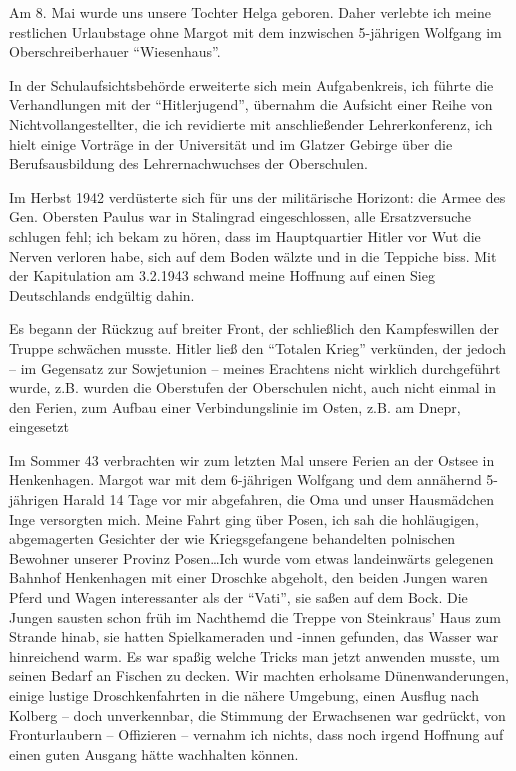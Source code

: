 \documentclass[a5paper,pagesize,10pt,twoside=true]{scrbook}
\renewcommand{\marginpar}[2][]{}
\begin{document}
Am 8. Mai wurde uns unsere Tochter Helga geboren. Daher verlebte ich meine restlichen Urlaubstage ohne Margot mit dem inzwischen 5-jährigen Wolfgang im Oberschreiberhauer \enquote{Wiesenhaus}.

In der Schulaufsichtsbehörde erweiterte sich mein Aufgabenkreis, ich führte die Verhandlungen mit der \enquote{Hitlerjugend}, übernahm die Aufsicht einer Reihe von Nichtvollangestellter, die ich revidierte mit anschließender Lehrerkonferenz, ich hielt einige Vorträge in der Universität und im Glatzer Gebirge über die Berufsausbildung des Lehrernachwuchses der Oberschulen.

Im Herbst 1942 verdüsterte sich für uns der militärische Horizont: die Armee des Gen. Obersten Paulus war in Stalingrad eingeschlossen, alle Ersatzversuche schlugen fehl; ich bekam zu hören, dass im Hauptquartier Hitler vor Wut die Nerven verloren habe, sich auf dem Boden wälzte und in die Teppiche biss. Mit der Kapitulation am 3.2.1943 schwand meine Hoffnung auf einen Sieg Deutschlands endgültig dahin.

\marginpar{34} Es begann der Rückzug auf breiter Front, der schließlich den Kampfeswillen der Truppe schwächen musste. Hitler ließ den \enquote{Totalen Krieg} verkünden, der jedoch -- im Gegensatz zur Sowjetunion -- meines Erachtens nicht wirklich durchgeführt wurde, z.B. wurden die Oberstufen der Oberschulen nicht, auch nicht einmal in den Ferien, zum Aufbau einer Verbindungslinie im Osten, z.B. am Dnepr, eingesetzt

\marginpar{35} Im Sommer 43 verbrachten wir zum letzten Mal unsere Ferien an der Ostsee in Henkenhagen. Margot war mit dem 6-jährigen Wolfgang und dem annähernd 5-jährigen Harald 14 Tage vor mir abgefahren, die Oma und unser Hausmädchen Inge versorgten mich. Meine Fahrt ging über Posen, ich sah die hohläugigen, abgemagerten Gesichter der wie Kriegsgefangene behandelten polnischen Bewohner unserer Provinz Posen\dots Ich wurde vom etwas landeinwärts gelegenen Bahnhof Henkenhagen mit einer Droschke abgeholt, den beiden Jungen waren Pferd und Wagen interessanter als der \enquote{Vati}, sie saßen auf dem Bock. Die Jungen sausten schon früh im Nachthemd die Treppe von Steinkraus' Haus zum Strande hinab, sie hatten Spielkameraden und -innen gefunden, das Wasser war hinreichend warm. Es war spaßig \marginpar{36} welche Tricks man jetzt anwenden musste, um seinen Bedarf an Fischen zu decken. Wir machten erholsame Dünenwanderungen, einige lustige Droschkenfahrten in die nähere Umgebung, einen Ausflug nach Kolberg -- doch unverkennbar, die Stimmung der Erwachsenen war gedrückt, von Fronturlaubern -- Offizieren -- vernahm ich nichts, dass noch irgend Hoffnung auf einen guten Ausgang hätte wachhalten können.
\end{document}
